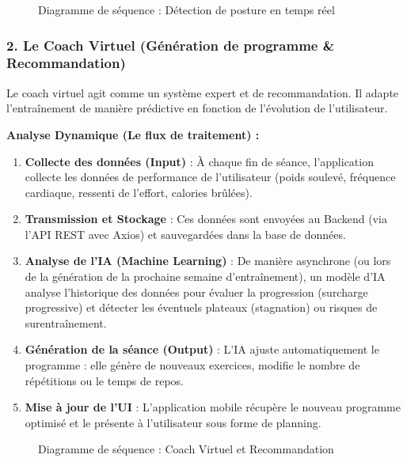 \begin{figure}[H]
    \centering
\caption{Diagramme de séquence : Détection de posture en temps réel}
\end{figure}

\subsubsection{2. Le Coach Virtuel (Génération de programme \& Recommandation)}
Le coach virtuel agit comme un système expert et de recommandation. Il adapte l'entraînement de manière prédictive en fonction de l'évolution de l'utilisateur.

\textbf{Analyse Dynamique (Le flux de traitement) :}
\begin{enumerate}
    \item \textbf{Collecte des données (Input)} : À chaque fin de séance, l'application collecte les données de performance de l'utilisateur (poids soulevé, fréquence cardiaque, ressenti de l'effort, calories brûlées).
    \item \textbf{Transmission et Stockage} : Ces données sont envoyées au Backend (via l'API REST avec Axios) et sauvegardées dans la base de données.
    \item \textbf{Analyse de l'IA (Machine Learning)} : De manière asynchrone (ou lors de la génération de la prochaine semaine d'entraînement), un modèle d'IA analyse l'historique des données pour évaluer la progression (surcharge progressive) et détecter les éventuels plateaux (stagnation) ou risques de surentraînement.
    \item \textbf{Génération de la séance (Output)} : L'IA ajuste automatiquement le programme : elle génère de nouveaux exercices, modifie le nombre de répétitions ou le temps de repos.
    \item \textbf{Mise à jour de l'UI} : L'application mobile récupère le nouveau programme optimisé et le présente à l'utilisateur sous forme de planning.
\end{enumerate}

\begin{figure}[H]
    \centering
\caption{Diagramme de séquence : Coach Virtuel et Recommandation}
\end{figure}

